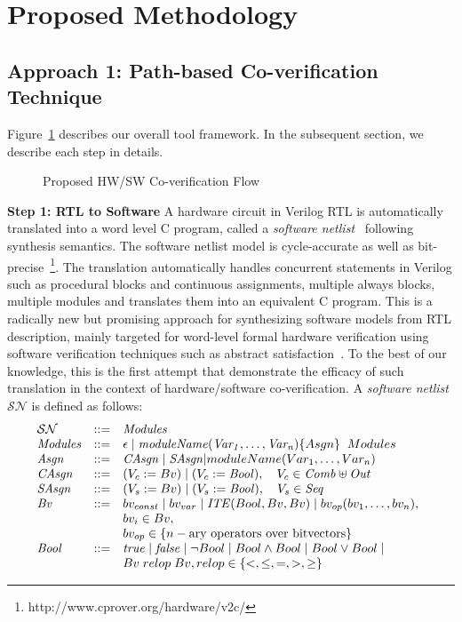 \documentclass[sigconf]{acmart}
\begin{document}
\section{Proposed Methodology}
%
\subsection{Approach 1: Path-based Co-verification Technique}
%
Figure~\ref{proposed-flow} describes our overall tool framework. In the
subsequent section, we describe each step in details.\\ 
%
\begin{figure}[t]
{}
\caption{Proposed HW/SW Co-verification Flow
\label{proposed-flow}}
\end{figure}
%
\textbf{Step 1: RTL to Software}
A hardware circuit in Verilog RTL is automatically 
translated into a word level C program, called a 
\textit{software netlist}~\cite{mtk2016,mskm2016,mkm2015} following synthesis 
semantics. The software netlist model is cycle-accurate as well as 
bit-precise~\footnote{http://www.cprover.org/hardware/v2c/}. The 
translation automatically handles concurrent statements 
in Verilog such as procedural blocks and continuous assignments, multiple always
blocks, multiple modules and translates them into an equivalent C program.  This
is a radically new but promising approach for synthesizing software 
models from RTL description, mainly targeted for word-level formal hardware 
verification using software verification techniques such as abstract 
satisfaction~\cite{leo-thesis}.  To the best of our knowledge, this is the first 
attempt that demonstrate the efficacy of such translation in the context of 
hardware/software co-verification. 
% 
A \textit{software netlist} $\mathcal{SN}$ is defined as follows:
%
\[ 
\begin{array}[t]{@{}lll}
\mathcal{SN} & {:}{:}{=} & \mathit{Modules} \\
\mathit{Modules} & {:}{:}{=} & \epsilon \mid \mathit{moduleName(Var_1,\dots,Var_n)} \{ Asgn \} \;\; Modules \\
\mathit{Asgn} &  {:}{:}{=} & \mathit{CAsgn} \mid \mathit{SAsgn} | moduleName(Var_1,\dots,Var_n)\\
\mathit{CAsgn} & {:}{:}{=} & (V_c := Bv) \mid (V_c := \mathit{Bool}), \quad V_c \in \mathit{Comb} \uplus \mathit{Out} \\
\mathit{SAsgn} & {:}{:}{=} & (V_s := Bv) \mid (V_s := \mathit{Bool}), \quad V_s \in \mathit{Seq} \\
\mathit{Bv} &  {:}{:}{=} & bv_{const} \mid bv_{var} \mid
	\mathit{ITE}(Bool, Bv, Bv) \mid
bv_{op}(bv_1, \ldots, bv_n), \\
& & bv_i \in Bv, \\ 
& & bv_{op} \in \{n-\text{ary operators over bitvectors} \} \\
\mathit{Bool} & {:}{:}{=} & \mathit{true} \mid \mathit{false} \mid \neg{Bool} \mid Bool \land Bool \mid 
Bool \lor Bool \mid \\ 
& & Bv\; relop\; Bv, relop \in \{<,\leq,=,>,\geq\} \\
\end{array}
\]
\end{document}
